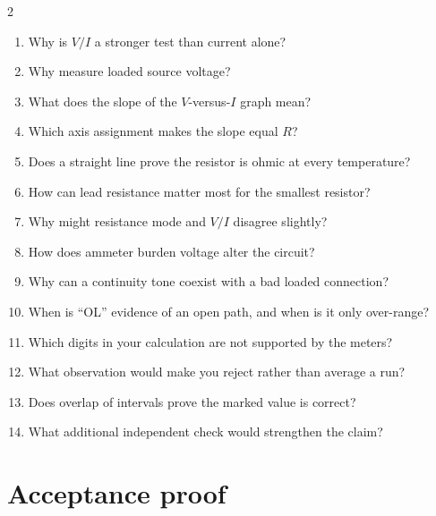 \begin{multicols}{2}
\begin{enumerate}
\item Why is \(V/I\) a stronger test than current alone?
\item Why measure loaded source voltage?
\item What does the slope of the \(V\)-versus-\(I\) graph mean?
\item Which axis assignment makes the slope equal \(R\)?
\item Does a straight line prove the resistor is ohmic at every temperature?
\item How can lead resistance matter most for the smallest resistor?
\item Why might resistance mode and \(V/I\) disagree slightly?
\item How does ammeter burden voltage alter the circuit?
\item Why can a continuity tone coexist with a bad loaded connection?
\item When is ``OL'' evidence of an open path, and when is it only over-range?
\item Which digits in your calculation are not supported by the meters?
\item What observation would make you reject rather than average a run?
\item Does overlap of intervals prove the marked value is correct?
\item What additional independent check would strengthen the claim?
\end{enumerate}
\end{multicols}

\section{Acceptance proof}

